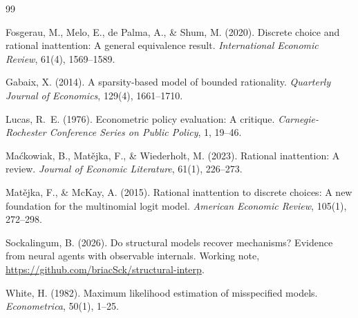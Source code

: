 \documentclass[11pt]{article}
\begin{document}
\begin{thebibliography}{99}\small

Fosgerau, M., Melo, E., de Palma, A., \& Shum, M. (2020). Discrete choice
and rational inattention: A general equivalence result.
\emph{International Economic Review}, 61(4), 1569--1589.

Gabaix, X. (2014). A sparsity-based model of bounded rationality.
\emph{Quarterly Journal of Economics}, 129(4), 1661--1710.

Lucas, R.~E. (1976). Econometric policy evaluation: A critique.
\emph{Carnegie-Rochester Conference Series on Public Policy}, 1, 19--46.

Ma\'ckowiak, B., Mat\v{e}jka, F., \& Wiederholt, M. (2023). Rational
inattention: A review. \emph{Journal of Economic Literature}, 61(1),
226--273.

Mat\v{e}jka, F., \& McKay, A. (2015). Rational inattention to discrete
choices: A new foundation for the multinomial logit model. \emph{American
Economic Review}, 105(1), 272--298.

Sockalingum, B. (2026). Do structural models recover mechanisms? Evidence
from neural agents with observable internals. Working note,
\url{https://github.com/briacSck/structural-interp}.

White, H. (1982). Maximum likelihood estimation of misspecified models.
\emph{Econometrica}, 50(1), 1--25.

\end{thebibliography}

\end{document}
